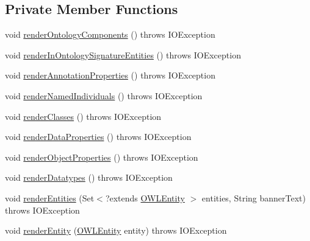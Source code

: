 \subsection*{Private Member Functions}
\begin{DoxyCompactItemize}
\item 
void \hyperlink{classorg_1_1coode_1_1owlapi_1_1rdf_1_1renderer_1_1_r_d_f_renderer_base_a58d6a479ee97b632e445f05a0511359e}{render\-Ontology\-Components} ()  throws I\-O\-Exception 
\item 
void \hyperlink{classorg_1_1coode_1_1owlapi_1_1rdf_1_1renderer_1_1_r_d_f_renderer_base_ad7dac0e79df58ce345a05d6281e83e3e}{render\-In\-Ontology\-Signature\-Entities} ()  throws I\-O\-Exception 
\item 
void \hyperlink{classorg_1_1coode_1_1owlapi_1_1rdf_1_1renderer_1_1_r_d_f_renderer_base_a01ea5039300c4b9b6fa7606b07a8f902}{render\-Annotation\-Properties} ()  throws I\-O\-Exception 
\item 
void \hyperlink{classorg_1_1coode_1_1owlapi_1_1rdf_1_1renderer_1_1_r_d_f_renderer_base_a9fe83bb15e0bf681894d8b3815a90edf}{render\-Named\-Individuals} ()  throws I\-O\-Exception 
\item 
void \hyperlink{classorg_1_1coode_1_1owlapi_1_1rdf_1_1renderer_1_1_r_d_f_renderer_base_ab29895042cb1f780ee8d6f048583fdc3}{render\-Classes} ()  throws I\-O\-Exception 
\item 
void \hyperlink{classorg_1_1coode_1_1owlapi_1_1rdf_1_1renderer_1_1_r_d_f_renderer_base_ab720bf3780a0fb58ccc925419f83e0f6}{render\-Data\-Properties} ()  throws I\-O\-Exception 
\item 
void \hyperlink{classorg_1_1coode_1_1owlapi_1_1rdf_1_1renderer_1_1_r_d_f_renderer_base_a86100afa658962643bb98bec57d80b91}{render\-Object\-Properties} ()  throws I\-O\-Exception 
\item 
void \hyperlink{classorg_1_1coode_1_1owlapi_1_1rdf_1_1renderer_1_1_r_d_f_renderer_base_aaca7b01d99cb76b8d88414984f1a01b6}{render\-Datatypes} ()  throws I\-O\-Exception 
\item 
void \hyperlink{classorg_1_1coode_1_1owlapi_1_1rdf_1_1renderer_1_1_r_d_f_renderer_base_aed80671fb8078c0c40ee07c676901eae}{render\-Entities} (Set$<$?extends \hyperlink{interfaceorg_1_1semanticweb_1_1owlapi_1_1model_1_1_o_w_l_entity}{O\-W\-L\-Entity} $>$ entities, String banner\-Text)  throws I\-O\-Exception 
\item 
void \hyperlink{classorg_1_1coode_1_1owlapi_1_1rdf_1_1renderer_1_1_r_d_f_renderer_base_a4a51b0841fbc40a3f0a4bb395c468a81}{render\-Entity} (\hyperlink{interfaceorg_1_1semanticweb_1_1owlapi_1_1model_1_1_o_w_l_entity}{O\-W\-L\-Entity} entity)  throws I\-O\-Exception 

\end{DoxyCompactItemize}
